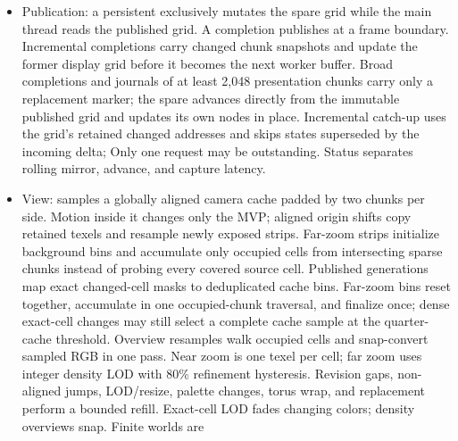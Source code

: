 \begin{itemize}
        same frontier, complete halo, worker-pool and memo paths with wrapped
        neighbor chunks: a canonical chunk's neighbor wraps by at most one
        period, each of a target's nine halo chunks resolves on its own, and
        the target set absorbs a small torus's duplicates, so horizontal,
        vertical, and corner seams are exact for binary and multi-state rules
        even on a 1$\times$1 torus. Tori skip the cell-candidate paths; the
        per-cell toroidal path remains the test reference (D-P35). The
        revision changes only when cell contents differ.
  \item Publication: a persistent  exclusively
        mutates the spare grid while the main thread reads the published grid.
        A completion publishes at a frame boundary. Incremental completions
        carry changed chunk snapshots and update the former display grid before
        it becomes the next worker buffer. Broad completions and journals of at
        least 2,048 presentation chunks carry only a
        replacement marker; the spare advances directly from the immutable
        published grid and updates its own nodes in place. Incremental catch-up uses the grid's retained
        changed addresses and skips states superseded by the incoming delta;
        Only one request may be outstanding. Status separates rolling mirror,
        advance, and capture latency.
  \item View:  samples a globally aligned camera cache
        padded by two chunks per side. Motion inside it changes only the MVP;
        aligned origin shifts copy retained texels and resample newly exposed
        strips. Far-zoom strips initialize background bins and accumulate only
        occupied cells from intersecting sparse chunks instead of probing every
        covered source cell. Published generations map exact changed-cell masks
        to deduplicated cache bins. Far-zoom bins reset together, accumulate in
        one occupied-chunk traversal, and finalize once; dense exact-cell
        changes may still select a complete cache sample at the quarter-cache
        threshold. Overview resamples walk occupied cells and snap-convert
        sampled RGB in one pass.
        Near zoom is one texel per cell; far zoom uses integer density LOD with
        80\% refinement hysteresis. Revision gaps, non-aligned jumps, LOD/resize,
        palette changes, torus wrap, and replacement perform a bounded refill.
        Exact-cell LOD fades changing colors; density overviews snap. Finite worlds are

\end{itemize}
